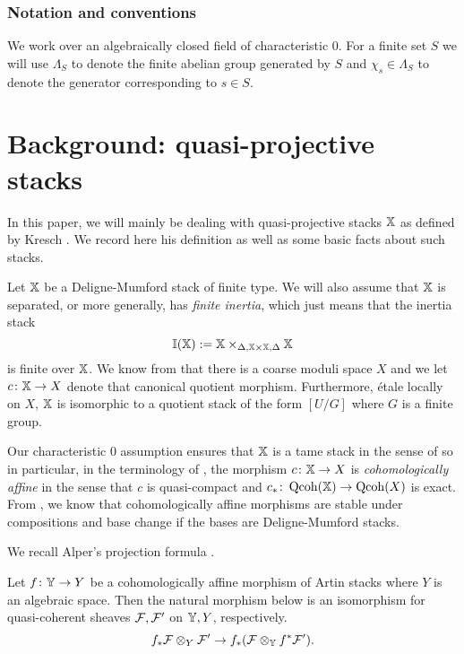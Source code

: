 \documentclass[12pt]{amsart}
\begin{document}
\subsubsection*{Notation and conventions}
We work over an algebraically closed field of characteristic 0.
For a finite set $S$ we will use $\Lambda_S$ to denote the finite abelian group generated by $S$ and $\chi_s \in \Lambda_S$ to denote the generator corresponding to $s \in S$.


\section{Background: quasi-projective stacks}

In this paper, we will mainly be dealing with quasi-projective stacks $\mathbb{X}$ as defined by Kresch \cite{Kr}. We record here his definition as well as some basic facts about such stacks.

Let $\mathbb{X}$ be a Deligne-Mumford stack of finite type. We will also assume that $\mathbb{X}$ is separated, or more generally, has {\em finite inertia}, which just means that the inertia stack $$\mathbb{I}(\mathbb{X}) :=\mathbb{X} \times_{\Delta,\mathbb{X} \times \mathbb{X} , \Delta} \mathbb{X}$$ 
is finite over $\mathbb{X}$. We know from \cite{KeM} that there is a coarse moduli space $X$ and we let $c\colon \mathbb{X} \to X$ denote that canonical quotient morphism. Furthermore, \'etale locally on $X$, $\mathbb{X}$ is isomorphic to a quotient stack of the form $[U/G]$ where $G$ is a finite group.

Our characteristic 0 assumption ensures that $\mathbb{X}$ is a tame stack in the sense of \cite{AOV} so in particular, in the terminology of \cite[Definition~3.1]{Alp}, the morphism $c \colon \mathbb{X} \to X$ is {\em cohomologically affine} in the sense that $c$ is quasi-compact and $c_* \colon \operatorname{Qcoh}(\mathbb{X}) \to \operatorname{Qcoh} (X)$ is exact.  From \cite[Proposition~3.10]{Alp}, we know that cohomologically affine morphisms are stable under compositions and base change if the bases are Deligne-Mumford stacks. 

We recall Alper's projection formula \cite[Proposition~4.5]{Alp}.
\begin{proposition}   \label{prop:projection}
Let $f \colon \mathbb{Y} \to Y$ be a cohomologically affine morphism of Artin stacks where $Y$ is an algebraic space. Then the natural morphism below is an isomorphism for quasi-coherent sheaves $\mathcal{F}, \mathcal{F}'$ on $\mathbb{Y}, Y$, respectively.
$$ f_* \mathcal{F} \otimes_{Y} \mathcal{F}' \to f_* (\mathcal{F} \otimes_{\mathbb{Y}} f^* \mathcal{F}').$$
\end{proposition}
\end{document}
